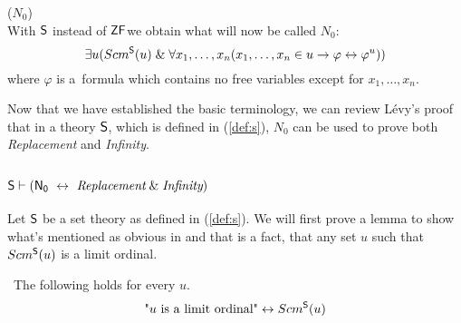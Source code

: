 \begin{definition}{($N_0$)}\label{def:levy_axiom_n0}\\
With $\sf{S}$ instead of $\sf{ZF}$we obtain what will now be called $N_0$:
\begin{equation}
\exists u (Scm^{\sf{S}}(u) \et \forall x_1, \ldots , x_n (x_1, \ldots , x_n \in u \then \varphi \iff \varphi^{u}))
\end{equation}
where $\varphi$ is a~formula which contains no free variables except for $x_1, \ldots , x_n$.
\end{definition}

Now that we have established the basic terminology, we can review Lévy's proof that in a theory $\sf{S}$, which is defined in (\ref{def:s}), $N_0$ can be used to prove both \emph{Replacement} and \emph{Infinity}.

\subsection{$\sf{S} \vdash (N_0\ \iff\ \emph{Replacement} \et \emph{Infinity})$} 

Let $\sf{S}$ be a set theory as defined in (\ref{def:s}). We will first prove a lemma to show what's mentioned as obvious in \cite{Levy60a} and that is a fact, that any set $u$ such that $Scm^{\sf{S}}(u)$ is a limit ordinal.
\begin{lemma}\label{lemma:scm_s_is_limit}\
The following holds for every $u$.
\begin{equation}
\mbox{"$u$ is a limit ordinal"} \iff Scm^{\sf{S}}(u)
\end{equation}
\end{lemma}

